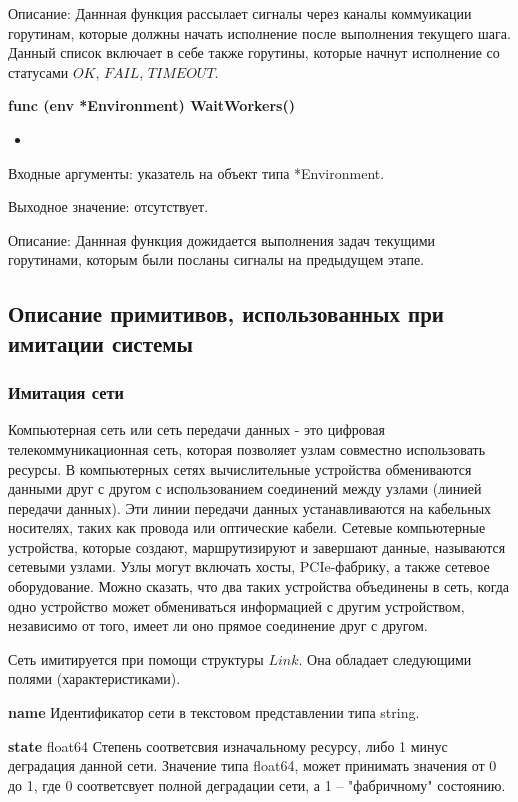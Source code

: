 Описание: Даннная функция рассылает сигналы через каналы коммуикации горутинам, которые должны начать исполнение после выполнения текущего шага. Данный список включает в себе также горутины, которые начнут исполнение со статусами $OK$, $FAIL$, $TIMEOUT$.

\textbf{func (env *Environment) WaitWorkers() }
\begin{itemize}
	\item 
\end{itemize}
Входные аргументы: указатель на объект типа *Environment.

Выходное значение: отсутствует. 

Описание: Даннная функция дожидается выполнения задач текущими горутинами, которым были посланы сигналы на предыдущем этапе.



\subsection{Описание примитивов, использованных при имитации системы}

\subsubsection{Имитация сети}
\par 
Компьютерная сеть или сеть передачи данных - это цифровая телекоммуникационная сеть, которая позволяет узлам совместно использовать ресурсы. В компьютерных сетях вычислительные устройства обмениваются данными друг с другом с использованием соединений между узлами (линией передачи данных). Эти линии передачи данных устанавливаются на кабельных носителях, таких как провода или оптические кабели.
Сетевые компьютерные устройства, которые создают, маршрутизируют и завершают данные, называются сетевыми узлами. Узлы могут включать хосты, PCIe-фабрику, а также сетевое оборудование. Можно сказать, что два таких устройства объединены в сеть, когда одно устройство может обмениваться информацией с другим устройством, независимо от того, имеет ли оно прямое соединение друг с другом.

Сеть имитируется при помощи структуры $Link$. Она обладает следующими полями (характеристиками). 

\textbf{name}
Идентификатор сети в текстовом представлении типа string. 

\textbf{state}	 float64
Степень соответсвия изначальному ресурсу, либо 1 минус деградация данной сети. Значение типа float64, может принимать значения от 0 до 1, где 0 соответсвует полной деградации сети, а 1 -- "фабричному" состоянию. 

